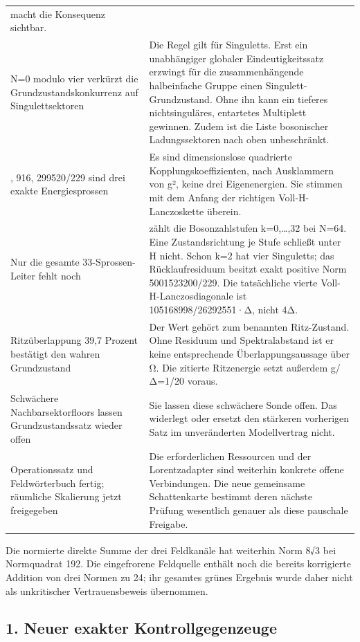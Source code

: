 {\begin{longtable}[]{@{}
  >{\raggedright\arraybackslash}p{}
  >{\raggedright\arraybackslash}p{}@{}}
macht die Konsequenz sichtbar. \\
N=0 modulo vier verkürzt die Grundzustandskonkurrenz auf
Singulettsektoren & Die Regel gilt für Singuletts. Erst ein unabhängiger
globaler Eindeutigkeitssatz erzwingt für die zusammenhängende
halbeinfache Gruppe einen Singulett-Grundzustand. Ohne ihn kann ein
tieferes nichtsinguläres, entartetes Multiplett gewinnen. Zudem ist die
Liste bosonischer Ladungssektoren nach oben unbeschränkt. \\
480, 916, 299520/229 sind drei exakte Energiesprossen & Es sind
dimensionslose quadrierte Kopplungskoeffizienten, nach Ausklammern von
g², keine drei Eigenenergien. Sie stimmen mit dem Anfang der richtigen
Voll-H-Lanczoskette überein. \\
Nur die gesamte 33-Sprossen-Leiter fehlt noch & 33 zählt die
Bosonzahlstufen k=0,\ldots,32 bei N=64. Eine Zustandsrichtung je Stufe
schließt unter H nicht. Schon k=2 hat vier Singuletts; das
Rücklaufresiduum besitzt exakt positive Norm 5001523200/229. Die
tatsächliche vierte Voll-H-Lanczosdiagonale ist 105168998/26292551·Δ,
nicht 4Δ. \\
Ritzüberlappung 39,7 Prozent bestätigt den wahren Grundzustand & Der
Wert gehört zum benannten Ritz-Zustand. Ohne Residuum und
Spektralabstand ist er keine entsprechende Überlappungsaussage über Ω.
Die zitierte Ritzenergie setzt außerdem g/Δ=1/20 voraus. \\
Schwächere Nachbarsektorfloors lassen Grundzustandssatz wieder offen &
Sie lassen diese schwächere Sonde offen. Das widerlegt oder ersetzt den
stärkeren vorherigen Satz im unveränderten Modellvertrag nicht. \\
Operationssatz und Feldwörterbuch fertig; räumliche Skalierung jetzt
freigegeben & Die erforderlichen Ressourcen und der Lorentzadapter sind
weiterhin konkrete offene Verbindungen. Die neue gemeinsame
Schattenkarte bestimmt deren nächste Prüfung wesentlich genauer als
diese pauschale Freigabe. \\
\end{longtable}
}

Die normierte direkte Summe der drei Feldkanäle hat weiterhin Norm 8√3
bei Normquadrat 192. Die eingefrorene Feldquelle enthält noch die
bereits korrigierte Addition von drei Normen zu 24; ihr gesamtes grünes
Ergebnis wurde daher nicht als unkritischer Vertrauensbeweis übernommen.

\subsection{1. Neuer exakter
Kontrollgegenzeuge}\label{neuer-exakter-kontrollgegenzeuge}

